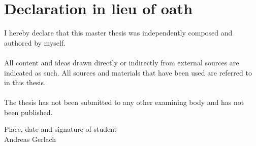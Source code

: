 
\chapter*{Declaration in lieu of oath}

I hereby declare that this master thesis was independently composed and authored by myself. \\ \\


All content and ideas drawn directly or indirectly from external sources are indicated as such. All sources and materials that have been used are referred to in this thesis. \\ \\


The thesis has not been submitted to any other examining body and has not been published.

\vspace{2cm}
Place, date and signature of student \\
\vspace{3cm}
Andreas Gerlach



